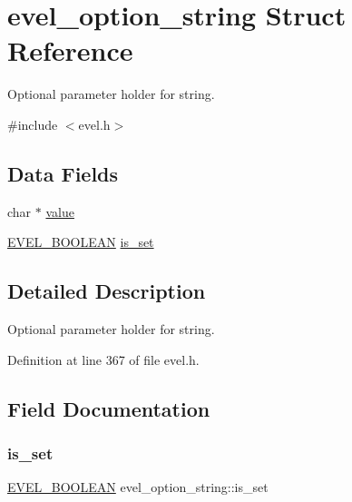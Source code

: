 \hypertarget{structevel__option__string}{}\section{evel\+\_\+option\+\_\+string Struct Reference}
\label{structevel__option__string}


Optional parameter holder for string.  




{\ttfamily \#include $<$evel.\+h$>$}

\subsection*{Data Fields}
\begin{DoxyCompactItemize}
\item 
char $\ast$ \hyperlink{structevel__option__string_a2e2900a5517b8ec07a6440413bdcb37a}{value}
\item 
\hyperlink{evel_8h_af6468c18baf048a7617b485eb432197e}{E\+V\+E\+L\+\_\+\+B\+O\+O\+L\+E\+AN} \hyperlink{structevel__option__string_aacc8b89963ad2f42792c53b07f54bb71}{is\+\_\+set}
\end{DoxyCompactItemize}


\subsection{Detailed Description}
Optional parameter holder for string. 

Definition at line 367 of file evel.\+h.



\subsection{Field Documentation}
\hypertarget{structevel__option__string_aacc8b89963ad2f42792c53b07f54bb71}{}\label{structevel__option__string_aacc8b89963ad2f42792c53b07f54bb71} 
\subsubsection{\texorpdfstring{is\+\_\+set}{is\_set}}
{\footnotesize\ttfamily \hyperlink{evel_8h_af6468c18baf048a7617b485eb432197e}{E\+V\+E\+L\+\_\+\+B\+O\+O\+L\+E\+AN} evel\+\_\+option\+\_\+string\+::is\+\_\+set}



